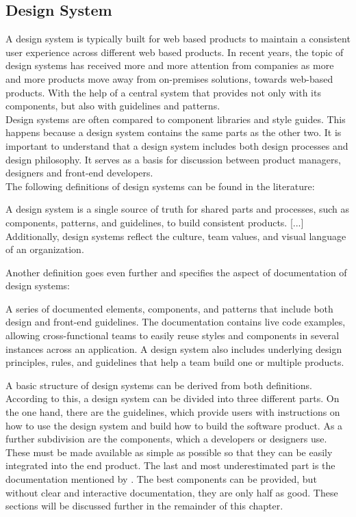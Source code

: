 \subsection{Design System}
A design system is typically built for web based products to maintain a consistent user experience across different web based products. In recent years, the topic of design systems has received more and more attention from companies as more and more products move away from on-premises solutions, towards web-based products.  With the help of a central system that provides not only with its components, but also with guidelines and patterns.  \citep{macdonald_practical_2019} \\
Design systems are often compared to component libraries and style guides. This happens because a design system contains the same parts as the other two. It is important to understand that a design system includes both design processes and design philosophy.  It serves as a basis for discussion between product managers, designers and front-end developers.   \cite{vesselov_building_2019} \\
The following definitions of design systems can be found in the literature:
\begin{tcolorbox}[title=Definition of design system by \citet*{macdonald_practical_2019}]
A design system is a single source of truth for shared parts and processes, such as components, patterns, and guidelines, to build consistent products. [...] Additionally, design systems reflect the culture, team values, and visual language of an organization.
\end{tcolorbox}
Another definition goes even further and specifies the aspect of documentation of design systems:
\begin{tcolorbox}[title=Definition of design system by \citet*{vesselov_building_2019}]
A series of documented elements, components, and patterns that include both design and front-end guidelines. The documentation contains live code examples, allowing cross-functional teams to easily reuse styles and components in several instances across an application. A design system also includes underlying design principles, rules, and guidelines that help a team build one or multiple products.
\end{tcolorbox}
A basic structure of design systems can be derived from both definitions. According to this, a design system can be divided into three different parts. On the one hand, there are the guidelines, which provide users with instructions on how to use the design system and build how to build the software product. As a further subdivision are the components, which a developers or designers use. These must be made available as simple as possible so that they can be easily integrated into the end product. The last and most underestimated part is the documentation mentioned by \citet*{vesselov_building_2019}. The best components can be provided, but without clear and interactive documentation, they are only half as good.  These sections will be discussed further in the remainder of this chapter. \cite{macdonald_practical_2019}\cite{vesselov_building_2019}

